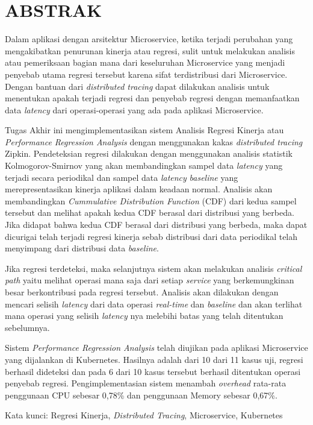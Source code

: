 \clearpage
\chapter*{ABSTRAK}

Dalam aplikasi dengan arsitektur Microservice, ketika terjadi perubahan yang mengakibatkan penurunan kinerja atau regresi, sulit untuk melakukan analisis atau pemeriksaan bagian mana dari keseluruhan Microservice yang menjadi penyebab utama regresi tersebut karena sifat terdistribusi dari Microservice. Dengan bantuan dari \textit{distributed tracing} dapat dilakukan analisis untuk menentukan apakah terjadi regresi dan penyebab regresi dengan memanfaatkan data \textit{latency} dari operasi-operasi yang ada pada aplikasi Microservice.

Tugas Akhir ini mengimplementasikan sistem Analisis Regresi Kinerja atau \textit{Performance Regression Analysis} dengan menggunakan kakas \textit{distributed tracing} Zipkin. Pendeteksian regresi dilakukan dengan menggunakan analisis statistik Kolmogorov-Smirnov yang akan membandingkan sampel data \textit{latency} yang terjadi secara periodikal dan sampel data \textit{latency} \textit{baseline} yang merepresentasikan kinerja aplikasi dalam keadaan normal. Analisis akan membandingkan \textit{Cummulative Distribution Function} (CDF) dari kedua sampel tersebut dan melihat apakah kedua CDF berasal dari distribusi yang berbeda. Jika didapat bahwa kedua CDF berasal dari distribusi yang berbeda, maka dapat dicurigai telah terjadi regresi kinerja sebab distribusi dari data periodikal telah menyimpang dari distribusi data \textit{baseline}.

Jika regresi terdeteksi, maka selanjutnya sistem akan melakukan analisis \textit{critical path} yaitu melihat operasi mana saja dari setiap \textit{service} yang berkemungkinan besar berkontribusi pada regresi tersebut. Analisis akan dilakukan dengan mencari selisih \textit{latency} dari data operasi \textit{real-time} dan \textit{baseline} dan akan terlihat mana operasi yang selisih \textit{latency} nya melebihi batas yang telah ditentukan sebelumnya.

Sistem \textit{Performance Regression Analysis} telah diujikan pada aplikasi Microservice yang dijalankan di Kubernetes. Hasilnya adalah dari 10 dari 11 kasus uji, regresi berhasil dideteksi dan pada 6 dari 10 kasus tersebut berhasil ditentukan operasi penyebab regresi. Pengimplementasian sistem menambah \textit{overhead} rata-rata penggunaan CPU sebesar 0,78\% dan penggunaan Memory sebesar 0,67\%.



\vspace{10mm}
Kata kunci: Regresi Kinerja, \textit{Distributed Tracing}, Microservice, Kubernetes
\clearpage